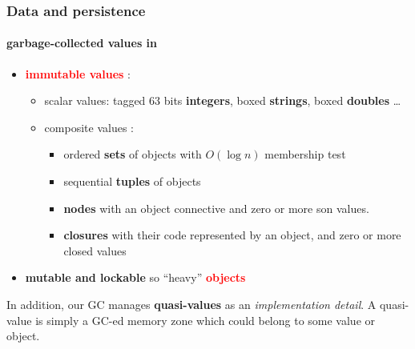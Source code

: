 \documentclass[xcolor=svgnames,final,smaller,a4]{beamer}
\begin{document}
\begin{frame}
    \frametitle{Data and persistence}
    \framesubtitle{garbage-collected values in \Bismon}

    \begin{itemize}
    \item {\textcolor{red}{\textbf{immutable values}}}  {} : \begin{itemize}
    \item scalar values: tagged 63 bits \textbf{integers}, boxed \textbf{strings}, boxed \textbf{doubles} {} \ldots
    \item composite values : \begin{itemize}
    \item ordered \textbf{sets} of objects with $O(\log n)$ membership test
    \item sequential \textbf{tuples} of objects {}
    \item \textbf{nodes} with an object connective and zero or more son values.
      \item \textbf{closures} with their code represented by an object, and zero or more closed values {}
    \end{itemize}
    \end{itemize}
    \item \textbf{mutable and lockable} so ``heavy'' \textbf{\textcolor{red}{objects}} {}
    \end{itemize}

    In addition, our GC manages \textbf{quasi-values} as an
    \textit{implementation detail}. A quasi-value is simply a GC-ed
    memory zone which could belong to some value or object.
\end{frame}
\end{document}
